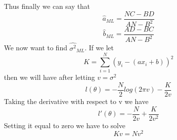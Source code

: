 \documentclass[11pt,psfig]{article}
\begin{document}
Thus finally we can say that
\[
\hat{a}_{ML} = \frac{NC-BD}{AN-B^2}
\]
\[
\hat{b}_{ML} = \frac{AD-BC}{AN-B^2}
\]
We now want to find $\hat{\sigma^2}_{ML}$. If we let
\[
K = \sum_{i=1}^N{(y_i - (ax_i + b))^2}
\]
then we will have after letting $v = \sigma^2$
\[
l(\theta) = -\frac{N}{2} log(2\pi v) - \frac{K}{2v}
\]
Taking the derivative with respect to v we have
\[
l'(\theta) = -\frac{N}{2v} + \frac{K}{2v^2}
\]
Setting it equal to zero we have to solve
\[
Kv = N v^2
\]
\end{document}
